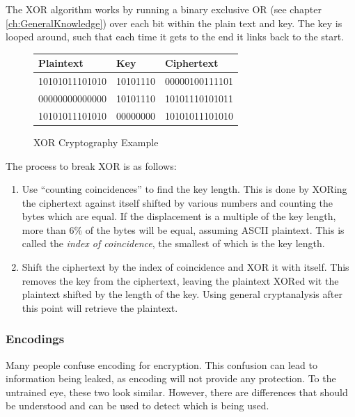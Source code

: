 				The XOR algorithm works by running a binary exclusive OR (see chapter \ref{ch:GeneralKnowledge}) 
				over each bit within the plain text and key. 
				The key is looped around, such that each time it gets to the end it links back to the start. 

				\begin{figure}[htb]
					\centering
					\begin{tabular}{| l | l | l |}
						\hline
						\textbf{Plaintext} & \textbf{Key} & \textbf{Ciphertext} \\ \hline
						10101011101010 & 10101110 & 00000100111101 \\ \hline
						00000000000000 & 10101110 & 10101110101011 \\ \hline
						10101011101010 & 00000000 & 10101011101010 \\ \hline
					\end{tabular}
					\caption{XOR Cryptography Example}
					\label{fig:XORExample}
				\end{figure}
				The process to break XOR is as follows:
				\begin{enumerate}
					\item Use ``counting coincidences'' to find the key length. 
						This is done by XORing the ciphertext against itself shifted by various numbers and counting the bytes which are equal. 
						If the displacement is a multiple of the key length, more than 6\% of the bytes will be equal, assuming ASCII plaintext. 
						This is called the \emph{index of coincidence}, the smallest of which is the key length. 
					\item Shift the ciphertext by the index of coincidence and XOR it with itself. 
						This removes the key from the ciphertext, leaving the plaintext XORed wit the plaintext shifted by the length of the key. 
						Using general cryptanalysis after this point will retrieve the plaintext. 
				\end{enumerate}

			\subsubsection{Encodings}
				Many people confuse encoding for encryption. 
				This confusion can lead to information being leaked, as encoding will not provide any protection. 
				To the untrained eye, these two look similar. 
				However, there are differences that should be understood and can be used to detect which is being used. 

